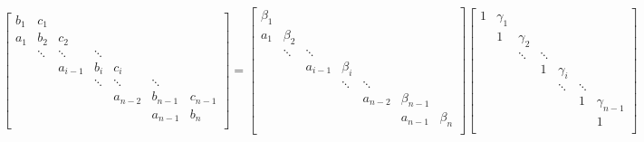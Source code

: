 \documentclass[landscape]{article}
\begin{document}
\[
\left[\begin{array}{ccccccccc}
b_{1} & c_{1}    &           &           &           &           &         \\
a_{1} & b_{2}    & c_{2}     &           &           &           &         \\
      & \ddots   & \ddots    & \ddots    &           &           &         \\
      &          & a_{i-1}   & b_{i}     & c_{i}     &           &         \\
      &          &           & \ddots    & \ddots    & \ddots    &         \\
      &          &           &           & a_{n-2}   & b_{n-1}   & c_{n-1} \\
      &          &           &           &           & a_{n-1}   & b_{n}   \\
\end{array} \right]
=
\left[\begin{array}{ccccccccc}
\beta_{1}  &               &              &              &              &             &           \\
a_{1} &      \beta_{2}     &              &              &              &             &           \\
           & \ddots        & \ddots       &              &              &             &           \\
           &               & a_{i-1}      & \beta_{i}    &              &             &           \\
           &               &              & \ddots       & \ddots       &             &           \\
           &               &              &              & a_{n-2}      & \beta_{n-1} &           \\
           &               &              &              &              & a_{n-1}     & \beta_{n} \\
\end{array} \right]
\left[\begin{array}{ccccccccc}
1     & \gamma_{1}  &           &           &              &           &             \\
      & 1           & \gamma_{2}            &              &           &             \\
      &             & \ddots    & \ddots    &              &           &             \\
      &             &           & 1         & \gamma_{i}   &           &             \\
      &             &           &           & \ddots       & \ddots    &             \\
      &             &           &           &              & 1         & \gamma_{n-1}\\
      &             &           &           &              &           & 1           \\
\end{array} \right]
\]
\end{document}
